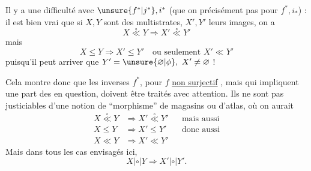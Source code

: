 Il y a une difficulté avec $\unsure{f^*|j^*}, i^*$ (que on  précisément pas pour $f^*, i_*$) : il est bien vrai que si $X,Y$ sont des multistrates, $X',Y'$ leurs images, on a
\[
X\overset{\circ}{\ll}Y\Longrightarrow X'\overset{\circ}{\ll}Y'
\]
mais 
\[
X\leq Y\Longrightarrow X'\leq Y'\quad\text{ou seulement }X'\ll Y'
\]
puisqu'il peut arriver que $Y'=\unsure{\varnothing|\phi},\ X'\ne\varnothing$ !

Cela montre donc que les  inverses $f^*$, pour $f$ \uline{non surjectif} ,   mais qui impliquent une part des  en question, doivent être traités avec  attention. Ils ne sont pas justiciables d'une notion  de ``morphisme'' de magasins ou d'atlas, où on aurait
\[
\begin{aligned}
X\overset{\circ}{\ll}Y&\Longrightarrow X'\overset{\circ}{\ll}Y'&&\text{mais aussi}\\
X\leq Y&\Longrightarrow X'\leq Y'&&\text{donc aussi}\\
X\ll Y&\Longrightarrow X'\ll Y'
\end{aligned}
\]
Mais dans tous les cas envisagés ici, 
\[
X\mathrel{|\circ|}Y\Longrightarrow X'\mathrel{|\circ|}Y'.
\]
